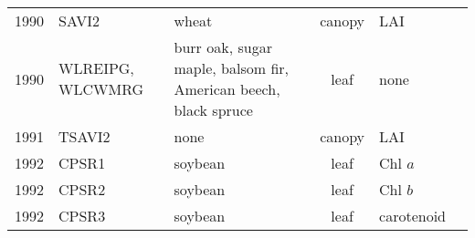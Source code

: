 \documentclass[10pt]{article}
\begin{document}
{\begin{ThreePartTable}
\begin{longtable}{c M{1.5in} M{2.5in} c M{1.5in} M{1.5in}}
  1990 & SAVI2                                           & wheat                                                                                                                                                                                                                                                 & canopy       & LAI                                                                                      & \citet{Major1990}                                   \\
  1990 & WLREIPG, WLCWMRG                                & burr oak, sugar maple, balsom fir, American beech, black spruce                                                                                                                                                                                       & leaf         & none                                                                                     & \citet{Miller1990}                                  \\
  1991 & TSAVI2                                          & none                                                                                                                                                                                                                                                  & canopy       & LAI                                                                                      & \citet{Baret1991}                                   \\
  1992 & CPSR1                                           & soybean                                                                                                                                                                                                                                               & leaf         & Chl $a$                                                                                  & \citet{Chappelle1992}                               \\
  1992 & CPSR2                                           & soybean                                                                                                                                                                                                                                               & leaf         & Chl $b$                                                                                  & \citet{Chappelle1992}                               \\
  1992 & CPSR3                                           & soybean                                                                                                                                                                                                                                               & leaf         & carotenoid                                                                               & \citet{Chappelle1992}                               \\

\end{longtable}
\end{ThreePartTable}}
\end{document}
